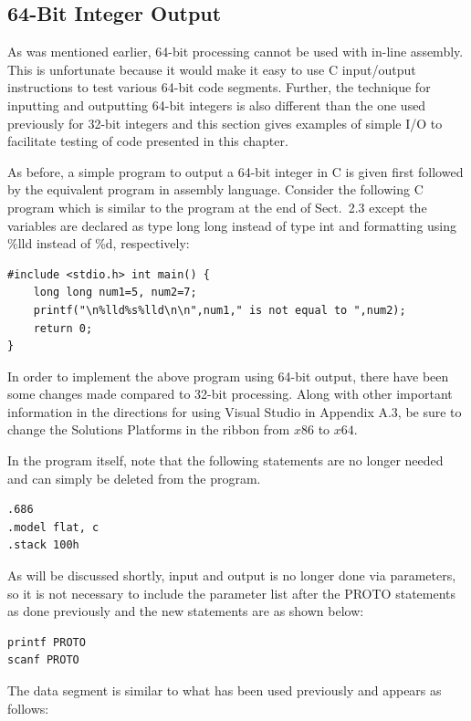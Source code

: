 \documentclass[10pt]{book}
\begin{document}
\subsection{64-Bit Integer Output}
As was mentioned earlier, 64-bit processing cannot be used with in-line assembly. This is unfortunate because it would make it easy to use C input/output instructions to test various 64-bit code segments. Further, the technique for inputting and outputting 64-bit integers is also different than the one used previously for 32-bit integers and this section gives examples of simple I/O to facilitate testing of code presented in this chapter.

As before, a simple program to output a 64-bit integer in C is given first followed by the equivalent program in assembly language. Consider the following C program which is similar to the program at the end of Sect.\ 2.3 except the variables are declared as type long long instead of type int and formatting using \%lld instead of \%d, respectively:

\begin{verbatim}
#include <stdio.h> int main() {
    long long num1=5, num2=7;
    printf("\n%lld%s%lld\n\n",num1," is not equal to ",num2);
    return 0;
}
\end{verbatim}

In order to implement the above program using 64-bit output, there have been some changes made compared to 32-bit processing. Along with other important information in the directions for using Visual Studio in Appendix A.3, be sure to change the Solutions Platforms in the ribbon from $x86$ to $x64$.

In the program itself, note that the following statements are no longer needed and can simply be deleted from the program.

\begin{verbatim}
.686
.model flat, c
.stack 100h
\end{verbatim}

As will be discussed shortly, input and output is no longer done via parameters, so it is not necessary to include the parameter list after the PROTO statements as done previously and the new statements are as shown below:

\begin{verbatim}
printf PROTO
scanf PROTO
\end{verbatim}

The data segment is similar to what has been used previously and appears as follows:
\end{document}
